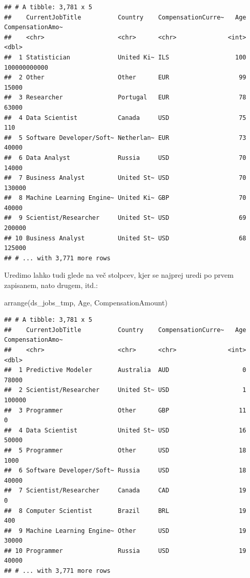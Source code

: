 \documentclass[
]{book}
\newenvironment{Shaded}{\begin{snugshade}}{\end{snugshade}}
\newcommand{\FunctionTok}[1]{\textcolor[rgb]{0.00,0.00,0.00}{#1}}
\newcommand{\NormalTok}[1]{#1}
\begin{document}
\begin{verbatim}
## # A tibble: 3,781 x 5
##    CurrentJobTitle          Country    CompensationCurre~   Age CompensationAmo~
##    <chr>                    <chr>      <chr>              <int>            <dbl>
##  1 Statistician             United Ki~ ILS                  100     100000000000
##  2 Other                    Other      EUR                   99            15000
##  3 Researcher               Portugal   EUR                   78            63000
##  4 Data Scientist           Canada     USD                   75              110
##  5 Software Developer/Soft~ Netherlan~ EUR                   73            40000
##  6 Data Analyst             Russia     USD                   70            14000
##  7 Business Analyst         United St~ USD                   70           130000
##  8 Machine Learning Engine~ United Ki~ GBP                   70            40000
##  9 Scientist/Researcher     United St~ USD                   69           200000
## 10 Business Analyst         United St~ USD                   68           125000
## # ... with 3,771 more rows
\end{verbatim}

Uredimo lahko tudi glede na več stolpcev, kjer se najprej uredi po prvem zapisanem, nato drugem, itd.:

\begin{Shaded}
\begin{Highlighting}[]
\FunctionTok{arrange}\NormalTok{(ds\_jobs\_tmp, Age, CompensationAmount)}
\end{Highlighting}
\end{Shaded}

\begin{verbatim}
## # A tibble: 3,781 x 5
##    CurrentJobTitle          Country    CompensationCurre~   Age CompensationAmo~
##    <chr>                    <chr>      <chr>              <int>            <dbl>
##  1 Predictive Modeler       Australia  AUD                    0            78000
##  2 Scientist/Researcher     United St~ USD                    1           100000
##  3 Programmer               Other      GBP                   11                0
##  4 Data Scientist           United St~ USD                   16            50000
##  5 Programmer               Other      USD                   18             1000
##  6 Software Developer/Soft~ Russia     USD                   18            40000
##  7 Scientist/Researcher     Canada     CAD                   19                0
##  8 Computer Scientist       Brazil     BRL                   19              400
##  9 Machine Learning Engine~ Other      USD                   19            30000
## 10 Programmer               Russia     USD                   19            40000
## # ... with 3,771 more rows
\end{verbatim}
\end{document}
